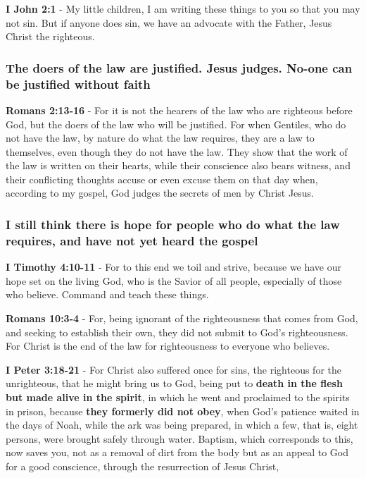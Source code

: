\documentclass[11pt]{article}
\begin{document}
\textbf{I John 2:1} - My little children, I am writing these things to you so that you may not sin. But if anyone does sin, we have an advocate with the Father, Jesus Christ the righteous.

\subsubsection{The doers of the law are justified. Jesus judges. No-one can be justified without faith}
\label{sec:org21d2018}
\textbf{Romans 2:13-16} - For it is not the hearers of the law who are righteous before God, but the doers of the law who will be justified.  For when Gentiles, who do not have the law, by nature do what the law requires, they are a law to themselves, even though they do not have the law.  They show that the work of the law is written on their hearts, while their conscience also bears witness, and their conflicting thoughts accuse or even excuse them on that day when, according to my gospel, God judges the secrets of men by Christ Jesus.

\subsubsection{I still think there is hope for people who do what the law requires, and have not yet heard the gospel}
\label{sec:org2cab965}
\textbf{I Timothy 4:10-11} - For to this end we toil and strive, because we have our hope set on the living God, who is the Savior of all people, especially of those who believe. Command and teach these things.

\textbf{Romans 10:3-4} - For, being ignorant of the righteousness that comes from God, and seeking to establish their own, they did not submit to God's righteousness. For Christ is the end of the law for righteousness to everyone who believes.

\textbf{I Peter 3:18-21} - For Christ also suffered once for sins, the righteous for the unrighteous, that he might bring us to God, being put to \textbf{death in the flesh but made alive in the spirit}, in which he went and proclaimed to the spirits in prison, because \textbf{they formerly did not obey}, when God's patience waited in the days of Noah, while the ark was being prepared, in which a few, that is, eight persons, were brought safely through water. Baptism, which corresponds to this, now saves you, not as a removal of dirt from the body but as an appeal to God for a good conscience, through the resurrection of Jesus Christ,
\end{document}
